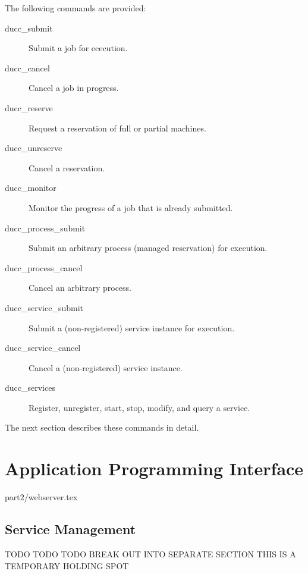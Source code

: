     The following commands are provided:
    \begin{description}
    \item[ducc\_submit] Submit a job for ececution.
    \item[ducc\_cancel] Cancel a job in progress.
    \item[ducc\_reserve] Request a reservation of full or partial machines.
    \item[ducc\_unreserve] Cancel a reservation.
    \item[ducc\_monitor] Monitor the progress of a job that is already submitted.
    \item[ducc\_process\_submit] Submit an arbitrary process (managed reservation) for execution.
    \item[ducc\_process\_cancel] Cancel an arbitrary process.
    \item[ducc\_service\_submit] Submit a (non-registered) service instance for execution.
    \item[ducc\_service\_cancel] Cancel a (non-registered) service instance.
    \item[ducc\_services] Register, unregister, start, stop, modify, and query a service.
    \end{description}
    
    The next section describes these commands in detail.

    
    
    
    
    
    
    
    
    
    



\chapter{Application Programming  Interface}



 {part2/webserver.tex}



      \section{Service Management}
          TODO TODO TODO BREAK OUT INTO SEPARATE SECTION
          THIS IS A TEMPORARY HOLDING SPOT 

